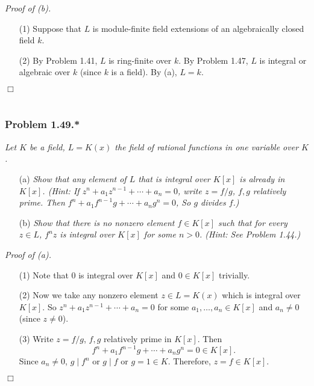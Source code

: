 \documentclass{article}
\begin{document}
\emph{Proof of (b).}
\begin{enumerate}
\item[(1)]
  Suppose that $L$ is module-finite field extensions of
  an algebraically closed field $k$.

\item[(2)]
  By Problem 1.41, $L$ is ring-finite over $k$.
  By Problem 1.47, $L$ is integral or algebraic over $k$ (since $k$ is a field).
  By (a), $L = k$.
\end{enumerate}
$\Box$ \\\\






\subsubsection*{Problem 1.49.*}
\emph{Let $K$ be a field, $L = K(x)$ the field of rational functions in one variable over $K$.} \\
\begin{enumerate}
\item[(a)]
  \emph{Show that any element of $L$ that is integral over $K[x]$ is already in $K[x]$.
  (Hint: If $z^n + a_1 z^{n-1} + \cdots + a_n = 0$, write $z = f/g$,
  $f, g$ relatively prime. Then $f^n + a_1 f^{n-1}g + \cdots + a_n g^n = 0$,
  So $g$ divides $f$.)}

\item[(b)]
  \emph{Show that there is no nonzero element $f \in K[x]$ such that for
  every $z \in L$, $f^n z$ is integral over $K[x]$ for some $n > 0$. (Hint: See Problem 1.44.)} \\
\end{enumerate}



\emph{Proof of (a).}
\begin{enumerate}
\item[(1)]
  Note that $0$ is integral over $K[x]$ and $0 \in K[x]$ trivially.

\item[(2)]
  Now we take any nonzero element $z \in L = K(x)$ which is integral over $K[x]$.
  So $z^n + a_1 z^{n-1} + \cdots + a_n = 0$ for some $a_1, \ldots, a_n \in K[x]$
  and $a_n \neq 0$ (since $z \neq 0$).

\item[(3)]
  Write $z = f/g$, $f, g$ relatively prime in $K[x]$.
  Then
  \[
    f^n + a_1 f^{n-1}g + \cdots + a_n g^n = 0 \in K[x].
  \]
  Since $a_n \neq 0$, $g \mid f^n$ or $g \mid f$ or $g = 1 \in K$.
  Therefore, $z = f \in K[x]$.
\end{enumerate}
$\Box$ \\
\end{document}

